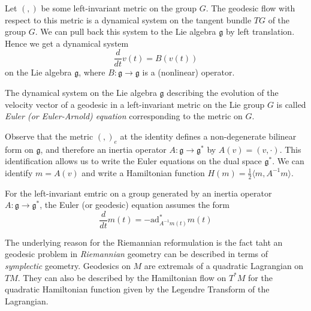 \indent Let $ (,)$ be some left-invariant metric on the group $G$. The geodesic flow with respect to this metric is a dynamical system on the tangent bundle $TG$ of the group $G$. We can pull back this system to the Lie algebra $ \mathfrak{g}$ by left translation. Hence we get a dynamical system
\[
	\frac{d}{dt}v(t) = B(v(t))
\]
on the Lie algebra $ \mathfrak{g}$, where $ B: \mathfrak{g} \to \mathfrak{g}$ is a (nonlinear) operator.


\begin{defn}

	The dynamical system on the Lie algebra $ \mathfrak{g}$ describing the evolution of the velocity vector of a geodesic in a left-invariant metric on the Lie group $G$ is called \textit{Euler (or Euler-Arnold) equation} corresponding to the metric on $G$.

\end{defn}


Observe that the metric $(,)_e$ at the identity defines a non-degenerate bilinear form on $ \mathfrak{g}$, and therefore an inertia operator $ A: \mathfrak{g} \to \mathfrak{g}^*$ by $A(v) = (v,\cdot)$. This identification allows us to write the Euler equations on the dual space $ \mathfrak{g}^*$. We can identify $m=A(v)$ and write a Hamiltonian function $H(m) = \frac{1}{2} \langle m, A^{-1}m \rangle $.



\begin{thm}

	For the left-invariant emtric on a group generated by an inertia operator $ A: \mathfrak{g} \to \mathfrak{g}^*$, the Euler (or geodesic) equation assumes the form 
	\[
		\frac{d}{dt}m(t) = - \mathrm{ad}^*_{A^{-1} m(t)} m(t)
	\]
	
\end{thm}



\begin{rmk}

The underlying reason for the Riemannian reformulation is the fact taht an geodesic problem in \textit{Riemannian} geometry can be described in terms of \textit{symplectic} geometry. Geodesics on $M$ are extremals of a quadratic Lagrangian on $TM$. They can also be described by the Hamiltonian flow on $T^*M$ for the quadratic Hamiltonian function given by the Legendre Transform of the Lagrangian.\\
 
\end{rmk}



